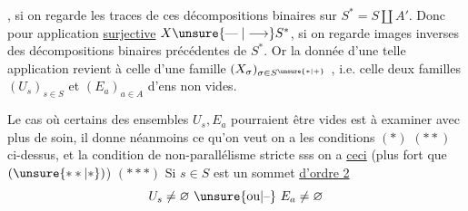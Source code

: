 , si on regarde les traces de ces décompositions binaires sur $S^\ast=S\amalg A'$. Donc pour  application \uline{surjective} $X\unsure{\mathrel{\text{---}}|\longrightarrow}S^\ast$, si on regarde  images
inverses des décompositions binaires précédentes de $S^\ast$. Or la donnée d'une telle application\unsure{,} revient à celle d'une famille $(X_\sigma)_{\sigma\in S^{\unsure{\ast|+}}}$ , i.e.  celle
 deux familles $(U_s)_{s\in S}$ et $(E_a)_{a\in A}$ d'ens non vides.

Le cas où certains des ensembles $U_s,E_a$ pourraient être vides est à examiner avec plus de soin, il donne néanmoins ce qu'on veut  on a les conditions $(\ast)$ $(\ast\ast)$ ci-dessus, et la condition de
non-parallélisme stricte sss on a \uline{ceci} (plus fort que $(\unsure{\ast\ast|\ast})$)
$(\ast\ast\ast)$ Si $s\in S$ est un sommet \uline{d'ordre 2}    
\[
U_s\ne\varnothing\ \unsure{\text{ou}|\text{--}}\ E_a\ne\varnothing
\]
